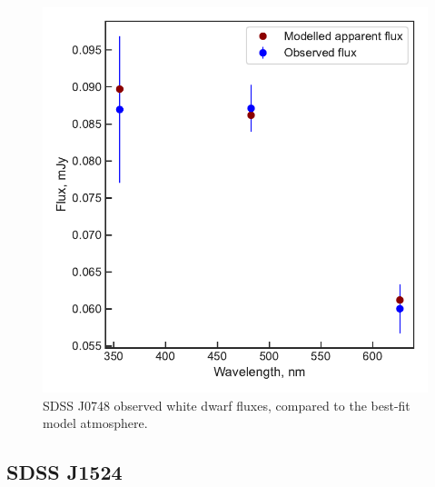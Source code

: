 \begin{figure}
    \centering
    \includegraphics[width=\textwidth]{figures/results/SDSS0748/fluxplot.pdf}
    \caption{SDSS J0748 observed white dwarf fluxes, compared to the best-fit model atmosphere.}
    \label{fig:SDSS0748 flux plot}
\end{figure}
\clearpage



\newpage
\subsection{SDSS J1524}


\begin{landscape}
    
\end{landscape}

